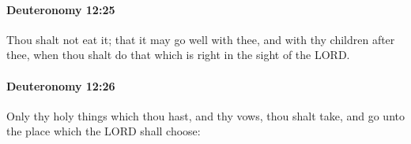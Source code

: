 		\paragraph{Deuteronomy 12:25} %
			\label{DEUTERONOMY-12-25}

			Thou shalt not eat it; that it may go well with thee, and with thy children after thee, when thou shalt do that which is right in the sight of the LORD.


		\paragraph{Deuteronomy 12:26} %
			\label{DEUTERONOMY-12-26}

			Only thy holy things which thou hast, and thy vows, thou shalt take, and go unto the place which the LORD shall choose:


